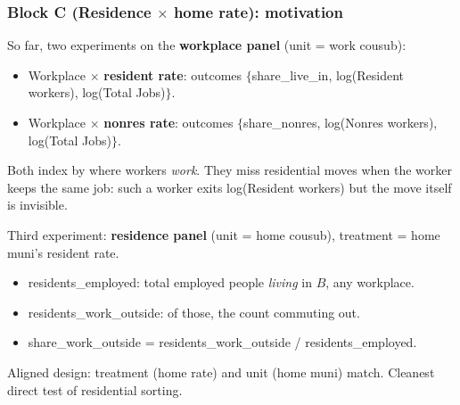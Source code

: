 \documentclass[xcolor = x11names, compress, aspectratio = 169]{beamer}
\renewcommand{\(}{\begin{columns}}
\renewcommand{\)}{\end{columns}}
\newcommand{\<}[1]{\begin{column}{#1}}
\renewcommand{\>}{\end{column}}
\begin{document}
\begin{frame}
\frametitle{Block C (Residence $\times$ home rate): motivation}
    \small
    So far, two experiments on the \textbf{workplace panel} (unit = work
    cousub):
    \begin{itemize}\setlength{\itemsep}{0.05cm}\small
        \item Workplace $\times$ \textbf{resident rate}:
        outcomes $\{$share\_live\_in, log(Resident workers), log(Total Jobs)$\}$.
        \item Workplace $\times$ \textbf{nonres rate}:
        outcomes $\{$share\_nonres, log(Nonres workers), log(Total Jobs)$\}$.
    \end{itemize}
    Both index by where workers \emph{work}. They miss residential moves
    when the worker keeps the same job: such a worker exits
    log(Resident workers) but the move itself is invisible.
    \medskip

    Third experiment: \textbf{residence panel} (unit = home cousub),
    treatment = home muni's resident rate.
    \begin{itemize}\setlength{\itemsep}{0.05cm}\small
        \item residents\_employed: total employed people \emph{living} in $B$, any workplace.
        \item residents\_work\_outside: of those, the count commuting out.
        \item share\_work\_outside = residents\_work\_outside / residents\_employed.
    \end{itemize}
    Aligned design: treatment (home rate) and unit (home muni) match.
    Cleanest direct test of residential sorting.
\end{frame}
\end{document}
